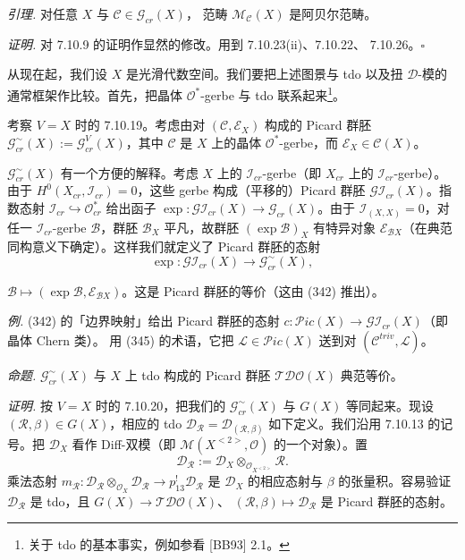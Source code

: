  \emph{引理.} 对任意 $X$ 与 $\mathcal{C}\in\mathcal{G}_{cr}(X)$，
范畴 $\mathcal{M}_{\mathcal{C}}(X)$ 是阿贝尔范畴。

\emph{证明.} 对 7.10.9 的证明作显然的修改。用到 7.10.23(ii)、7.10.22、
7.10.26。\hfill$\square$

 从现在起，我们设 $X$ 是光滑代数空间。我们要把上述图景与 tdo
以及扭 $\mathcal{D}$-模的通常框架作比较。首先，把晶体
$\mathcal{O}^*$-gerbe 与 tdo 联系起来\footnote{关于 tdo 的基本事实，例如参看
[BB93] 2.1。}。

考察 $V=X$ 时的 7.10.19。考虑由对 $(\mathcal{C},\mathcal{E}_X)$ 构成的
Picard 群胚 $\mathcal{G}^{\sim}_{cr}(X):=\mathcal{G}^{V}_{cr}(X)$，其中
$\mathcal{C}$ 是 $X$ 上的晶体 $\mathcal{O}^*$-gerbe，而
$\mathcal{E}_X\in\mathcal{C}(X)$。

$\mathcal{G}^{\sim}_{cr}(X)$ 有一个方便的解释。考虑 $X$ 上的
$\mathcal{I}_{cr}$-gerbe（即 $X_{cr}$ 上的 $\mathcal{I}_{cr}$-gerbe）。由于
$H^0(X_{cr},\mathcal{I}_{cr})=0$，这些 gerbe 构成（平移的）Picard 群胚
$\mathcal{G}\mathcal{I}_{cr}(X)$。指数态射
$\mathcal{I}_{cr}\hookrightarrow\mathcal{O}^*_{cr}$ 给出函子
$\exp:\mathcal{G}\mathcal{I}_{cr}(X)\to\mathcal{G}_{cr}(X)$。由于
$\mathcal{I}_{(X,X)}=0$，对任一 $\mathcal{I}_{cr}$-gerbe $\mathcal{B}$，群胚
$\mathcal{B}_X$ 平凡，故群胚 $(\exp\mathcal{B})_X$ 有特异对象
$\mathcal{E}_{\mathcal{B}X}$（在典范同构意义下确定）。这样我们就定义了 Picard
群胚的态射
\begin{equation}\tag{345}
\exp:\mathcal{G}\mathcal{I}_{cr}(X)\longrightarrow \mathcal{G}^{\sim}_{cr}(X),
\end{equation}


$\mathcal{B}\mapsto(\exp\mathcal{B},\mathcal{E}_{\mathcal{B}X})$。这是 Picard
群胚的等价（这由 (342) 推出）。

\emph{例.} (342) 的「边界映射」给出 Picard 群胚的态射
$c:\mathcal{P}ic(X)\to\mathcal{G}\mathcal{I}_{cr}(X)$（即晶体 Chern 类）。
用 (345) 的术语，它把 $\mathcal{L}\in\mathcal{P}ic(X)$ 送到对
$(\mathcal{C}^{triv},\mathcal{L})$。

 \emph{命题.} $\mathcal{G}^{\sim}_{cr}(X)$ 与 $X$ 上 tdo 构成的
Picard 群胚 $\mathcal{T}\mathcal{D}\mathcal{O}(X)$ 典范等价。

\emph{证明.} 按 $V=X$ 时的 7.10.20，把我们的 $\mathcal{G}^{\sim}_{cr}(X)$ 与
$G(X)$ 等同起来。现设 $(\mathcal{R},\beta)\in G(X)$，相应的 tdo
$\mathcal{D}_{\mathcal{R}}=\mathcal{D}_{(\mathcal{R},\beta)}$ 如下定义。我们沿用
7.10.13 的记号。把 $\mathcal{D}_X$ 看作 Diff-双模（即
$\mathcal{M}(X^{<2>},\mathcal{O})$ 的一个对象）。置
\[
\mathcal{D}_{\mathcal{R}}:=
\mathcal{D}_X\otimes_{\mathcal{O}_{X^{<2>}}}\mathcal{R}.
\]
乘法态射
$m_{\mathcal{R}}:\mathcal{D}_{\mathcal{R}}\otimes_{\mathcal{O}_X}
\mathcal{D}_{\mathcal{R}}\to p_{13}^{!}\mathcal{D}_{\mathcal{R}}$ 是
$\mathcal{D}_X$ 的相应态射与 $\beta$ 的张量积。容易验证
$\mathcal{D}_{\mathcal{R}}$ 是 tdo，且 $G(X)\to\mathcal{T}\mathcal{D}\mathcal{O}(X)$、
$(\mathcal{R},\beta)\mapsto\mathcal{D}_{\mathcal{R}}$ 是 Picard 群胚的态射。

